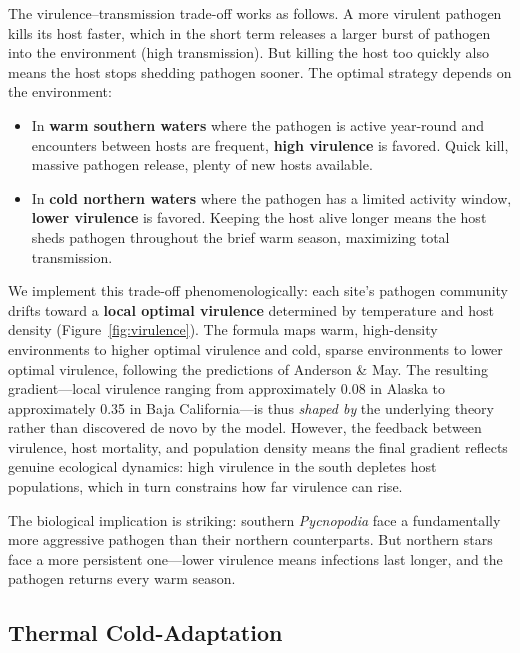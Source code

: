 \documentclass[11pt]{article}
\begin{document}
The virulence--transmission trade-off works as follows. A more virulent pathogen kills its host faster, which in the short term releases a larger burst of pathogen into the environment (high transmission). But killing the host too quickly also means the host stops shedding pathogen sooner. The optimal strategy depends on the environment:

\begin{itemize}[leftmargin=2em]
    \item In \textbf{warm southern waters} where the pathogen is active year-round and encounters between hosts are frequent, \textbf{high virulence} is favored. Quick kill, massive pathogen release, plenty of new hosts available.
    \item In \textbf{cold northern waters} where the pathogen has a limited activity window, \textbf{lower virulence} is favored. Keeping the host alive longer means the host sheds pathogen throughout the brief warm season, maximizing total transmission.
\end{itemize}

We implement this trade-off phenomenologically: each site's pathogen community drifts toward a \textbf{local optimal virulence} determined by temperature and host density (Figure~\ref{fig:virulence}). The formula maps warm, high-density environments to higher optimal virulence and cold, sparse environments to lower optimal virulence, following the predictions of Anderson \& May. The resulting gradient---local virulence ranging from approximately 0.08 in Alaska to approximately 0.35 in Baja California---is thus \textit{shaped by} the underlying theory rather than discovered de novo by the model. However, the feedback between virulence, host mortality, and population density means the final gradient reflects genuine ecological dynamics: high virulence in the south depletes host populations, which in turn constrains how far virulence can rise.

The biological implication is striking: southern \textit{Pycnopodia} face a fundamentally more aggressive pathogen than their northern counterparts. But northern stars face a more persistent one---lower virulence means infections last longer, and the pathogen returns every warm season.

\subsection{Thermal Cold-Adaptation}
\end{document}
